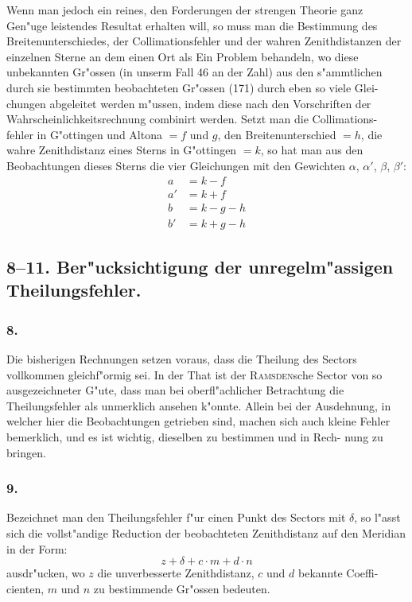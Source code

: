 \documentclass[12pt,a4paper]{article}
\theoremstyle{plain}
\theoremstyle{definition}
\theoremstyle{remark}
\begin{document}
Wenn man jedoch ein reines, den Forderungen der strengen Theorie ganz
Gen"uge leistendes Resultat erhalten will, so muss man die Bestimmung des
Breitenunterschiedes, der Collimationsfehler und der wahren Zenithdistanzen
der einzelnen Sterne an dem einen Ort als Ein Problem behandeln, wo diese
unbekannten Gr"ossen (in unserm Fall 46 an der Zahl) aus den s"ammtlichen
durch sie bestimmten beobachteten Gr"ossen (171) durch eben so viele Glei-
chungen abgeleitet werden m"ussen, indem diese nach den Vorschriften der
Wahrscheinlichkeitsrechnung combinirt werden. Setzt man die Collimations-
fehler in G"ottingen und Altona $= f$ und $g$, den Breitenunterschied $= h$,
die wahre Zenithdistanz eines Sterns in G"ottingen $= k$, so hat man aus den
Beobachtungen dieses Sterns die vier Gleichungen mit den Gewichten
$\alpha$, $\alpha'$, $\beta$, $\beta'$:
\begin{align*}
a &= k - f \\
a' &= k + f \\
b &= k - g - h \\
b' &= k + g - h
\end{align*}

\subsection*{8--11. Ber"ucksichtigung der unregelm"assigen Theilungsfehler.}

\subsubsection*{8.}

Die bisherigen Rechnungen setzen voraus, dass die Theilung des Sectors
vollkommen gleichf"ormig sei. In der That ist der \textsc{Ramsden}sche Sector
von so ausgezeichneter G"ute, dass man bei oberfl"achlicher Betrachtung die
Theilungsfehler als unmerklich ansehen k"onnte. Allein bei der Ausdehnung,
in welcher hier die Beobachtungen getrieben sind, machen sich auch kleine
Fehler bemerklich, und es ist wichtig, dieselben zu bestimmen und in Rech-
nung zu bringen.

\subsubsection*{9.}

Bezeichnet man den Theilungsfehler f"ur einen Punkt des Sectors mit
$\delta$, so l"asst sich die vollst"andige Reduction der beobachteten Zenithdistanz
auf den Meridian in der Form:
\[
z + \delta + c \cdot m + d \cdot n
\]
ausdr"ucken, wo $z$ die unverbesserte Zenithdistanz, $c$ und $d$ bekannte Coeffi-
cienten, $m$ und $n$ zu bestimmende Gr"ossen bedeuten.
\end{document}
